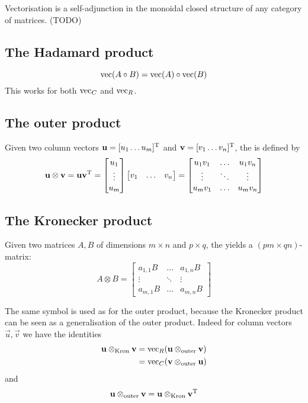 Vectorisation is a self-adjunction in the monoidal closed structure of any category of matrices. (TODO)
\subsection{The Hadamard product}
\[ \operatorname{vec}(A\circ B) = \operatorname{vec}(A) \circ \operatorname{vec}(B) \]
This works for both $\operatorname{vec}_C$ and $\operatorname{vec}_R$.
\subsection{The outer product}
Given two column vectors $\boldsymbol{\mathrm{u}} = [u_1 \hdots u_m]^{\mathrm{T}}$ and $\boldsymbol{\mathrm{v}} = [v_1 \hdots v_n]^{\mathrm{T}}$, the  is defined by
\[ \boldsymbol{\mathrm{u}}\otimes \boldsymbol{\mathrm{v}} = \boldsymbol{\mathrm{u}}\boldsymbol{\mathrm{v}}^{\mathrm{T}} = \begin{bmatrix}
u_1 \\ \vdots \\ u_m
\end{bmatrix} \begin{bmatrix}
v_1 & \hdots & v_n
\end{bmatrix} = \begin{bmatrix}
u_1v_1 & \hdots & u_1v_n \\
\vdots & \ddots & \vdots \\
u_mv_1 & \hdots & u_m v_n
\end{bmatrix} \]
\subsection{The Kronecker product}
Given two matrices $A,B$ of dimensions $m\times n$ and $p\times q$, the  yields a $(pm\times qn)$-matrix:
\[ A\otimes B = \begin{bmatrix}
a_{1,1}B & \hdots & a_{1,n}B \\
\vdots & \ddots & \vdots \\
a_{m,1}B & \hdots & a_{m,n}B
\end{bmatrix} \]

The same symbol is used as for the outer product, because the Kronecker product can be seen as a generalisation of the outer product. Indeed for column vectors $\vec{u}, \vec{v}$ we have the identities
\begin{align}
\boldsymbol{\mathrm{u}}\otimes_{\text{Kron}} \boldsymbol{\mathrm{v}} &= \operatorname{vec}_R(\boldsymbol{\mathrm{u}}\otimes_\text{outer} \boldsymbol{\mathrm{v}}) \\
&= \operatorname{vec}_C(\boldsymbol{\mathrm{v}}\otimes_\text{outer} \boldsymbol{\mathrm{u}})
\end{align}
and \[ \boldsymbol{\mathrm{u}}\otimes_\text{outer}\boldsymbol{\mathrm{v}} = \boldsymbol{\mathrm{u}}\otimes_{\text{Kron}} \boldsymbol{\mathrm{v}}^{\mathrm{T}} \]

